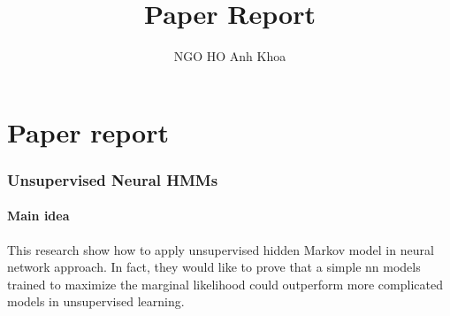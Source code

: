 \documentclass{article}
\title{Paper Report}
\author{NGO HO Anh Khoa}
\begin{document}
\maketitle

\tableofcontents
\newpage



\part{Paper report}


\section{Unsupervised Neural HMMs \citep{Tran16unsupervised}}
\subsection{Main idea}
This research show how to apply unsupervised hidden Markov model in neural network approach. In fact, they would like to prove that a simple nn models trained to maximize the marginal likelihood could outperform more complicated models in unsupervised learning.
\end{document}
